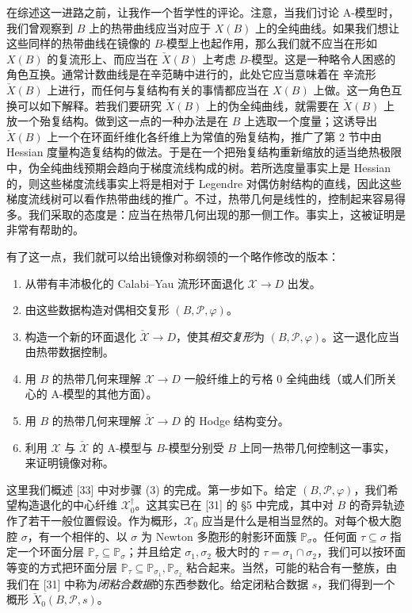 在综述这一进路之前，让我作一个哲学性的评论。注意，当我们讨论 A-模型时，我们曾观察到 $B$ 上的热带曲线应当对应于 $X(B)$ 上的全纯曲线。如果我们想让这些同样的热带曲线在镜像的 $B$-模型上也起作用，那么我们就不应当在形如 $X(B)$ 的复流形上、而应当在 $\check X(B)$ 上考虑 $B$-模型。这是一种略令人困惑的角色互换。通常计数曲线是在辛范畴中进行的，此处它应当意味着在
辛流形 $\check X(B)$ 上进行，而任何与复结构有关的事情都应当在 $X(B)$ 上做。这一角色互换可以如下解释。若我们要研究 $\check X(B)$ 上的伪全纯曲线，就需要在 $\check X(B)$ 上放一个殆复结构。做到这一点的一种办法是在 $B$ 上选取一个度量；这诱导出 $\check X(B)$ 上一个在环面纤维化各纤维上为常值的殆复结构，推广了第 2 节中由 Hessian 度量构造复结构的做法。于是在一个把殆复结构重新缩放的适当绝热极限中，伪全纯曲线预期会趋向于梯度流线构成的树。若所选度量事实上是 Hessian 的，则这些梯度流线事实上将是相对于 Legendre 对偶仿射结构的直线，因此这些梯度流线树可以看作热带曲线的推广。不过，热带几何是线性的，控制起来容易得多。我们采取的态度是：应当在热带几何出现的那一侧工作。事实上，这被证明是非常有帮助的。

有了这一点，我们就可以给出镜像对称纲领的一个略作修改的版本：
\begin{enumerate}
\item 从带有丰沛极化的 Calabi--Yau 流形环面退化 $\mathcal{X}\to D$ 出发。
\item 由这些数据构造对偶相交复形 $(B,\mathcal{P},\varphi)$。
\item 构造一个新的环面退化 $\check{\mathcal{X}}\to D$，使其\emph{相交复形}为 $(B,\mathcal{P},\varphi)$。这一退化应当由热带数据控制。
\item 用 $B$ 的热带几何来理解 $\mathcal{X}\to D$ 一般纤维上的亏格 $0$ 全纯曲线（或人们所关心的 A-模型的其他方面）。
\item 用 $B$ 的热带几何来理解 $\check{\mathcal{X}}\to D$ 的 Hodge 结构变分。
\item 利用 $\mathcal{X}$ 与 $\check{\mathcal{X}}$ 的 A-模型与 $B$-模型分别受 $B$ 上同一热带几何控制这一事实，来证明镜像对称。
\end{enumerate}

这里我们概述 [33] 中对步骤 (3) 的完成。第一步如下。给定 $(B,\mathcal{P},\varphi)$，我们希望构造退化的中心纤维 $\mathcal{X}_0^\dagger$。这其实已在 [31] 的 §5 中完成，其中对 $B$ 的奇异轨迹作了若干一般位置假设。作为概形，$\mathcal{X}_0$ 应当是什么是相当显然的。对每个极大胞腔 $\sigma$，有一个相伴的、以 $\sigma$ 为 Newton 多胞形的射影环面簇 $\mathbb{P}_\sigma$。任何面 $\tau\subseteq\sigma$ 指定一个环面分层 $\mathbb{P}_\tau\subseteq\mathbb{P}_\sigma$；并且给定 $\sigma_1,\sigma_2$ 极大时的 $\tau=\sigma_1\cap\sigma_2$，我们可以按环面等变的方式把环面分层 $\mathbb{P}_\tau\subseteq\mathbb{P}_{\sigma_1},\mathbb{P}_{\sigma_2}$ 粘合起来。当然，可能的粘合有一整族，由我们在 [31] 中称为\emph{闭粘合数据}的东西参数化。给定闭粘合数据 $s$，我们得到一个概形 $\check X_0(B,\mathcal{P},s)$。

